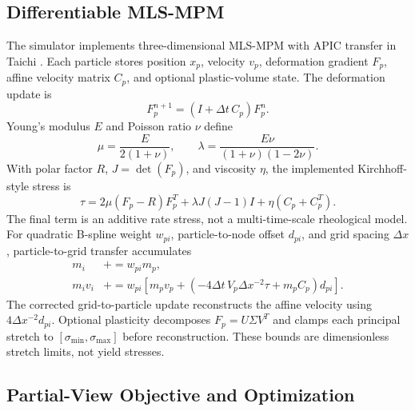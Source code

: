 \subsection{Differentiable MLS-MPM}

The simulator implements three-dimensional MLS-MPM with APIC transfer
\cite{jiang2016mpm} in Taichi \cite{hu2019taichi}.  Each particle stores
position $x_p$, velocity $v_p$, deformation gradient $F_p$, affine velocity
matrix $C_p$, and optional plastic-volume state.  The deformation update is
\begin{equation}
 F_p^{n+1}=(I+\Delta t\,C_p)F_p^n .
 \label{eq:deformation_update}
\end{equation}
Young's modulus $E$ and Poisson ratio $\nu$ define
\begin{equation}
 \mu=\frac{E}{2(1+\nu)},\qquad
 \lambda=\frac{E\nu}{(1+\nu)(1-2\nu)} .
 \label{eq:lame}
\end{equation}
With polar factor $R$, $J=\det(F_p)$, and viscosity $\eta$, the implemented
Kirchhoff-style stress is
\begin{equation}
 \tau=2\mu(F_p-R)F_p^T+\lambda J(J-1)I
   +\eta(C_p+C_p^T).
 \label{eq:stress}
\end{equation}
The final term is an additive rate stress, not a multi-time-scale rheological
model.  For quadratic B-spline weight $w_{pi}$, particle-to-node offset
$d_{pi}$, and grid spacing $\Delta x$, particle-to-grid transfer accumulates
\begin{align}
 m_i &\mathrel{+}=w_{pi}m_p,\\
 m_i v_i &\mathrel{+}=w_{pi}\!\left[m_pv_p+
 \left(-4\Delta t\,V_p\Delta x^{-2}\tau+m_pC_p\right)d_{pi}\right].
 \label{eq:p2g}
\end{align}
The corrected grid-to-particle update reconstructs the affine velocity using
$4\Delta x^{-2}d_{pi}$.  Optional plasticity decomposes
$F_p=U\Sigma V^T$ and clamps each principal stretch to
$[\sigma_{\min},\sigma_{\max}]$ before reconstruction.  These bounds are
dimensionless stretch limits, not yield stresses.

\subsection{Partial-View Objective and Optimization}

